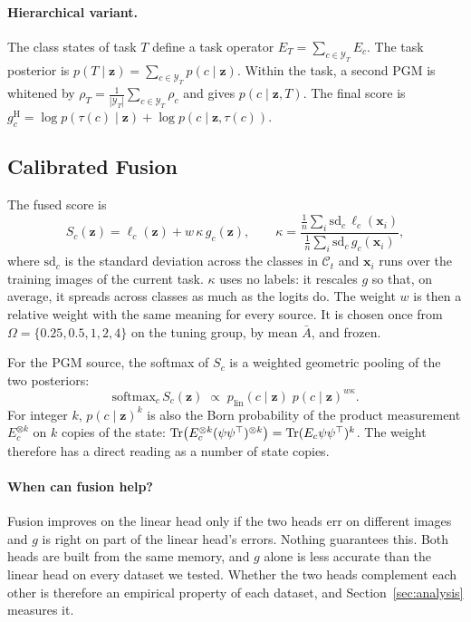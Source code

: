 \paragraph{Hierarchical variant.}
The class states of task $T$ define a task operator
$E_T=\sum_{c\in\mathcal Y_T}E_c$. The task posterior is
$p(T\mid\mathbf z)=\sum_{c\in\mathcal Y_T}p(c\mid\mathbf z)$. Within the task, a
second PGM is whitened by $\rho_T=\frac1{|\mathcal Y_T|}\sum_{c\in\mathcal Y_T}\rho_c$
and gives $p(c\mid\mathbf z,T)$. The final score is
$g^{\mathrm{H}}_c=\log p(\tau(c)\mid\mathbf z)+\log p(c\mid\mathbf z,\tau(c))$.

\subsection{Calibrated Fusion}
The fused score is
\begin{equation}
  S_c(\mathbf z)=\ell_c(\mathbf z)+w\,\kappa\,g_c(\mathbf z),\qquad
  \kappa=\frac{\frac1{n}\sum_{i}\mathrm{sd}_c\,\ell_c(\mathbf x_i)}{\frac1{n}\sum_{i}\mathrm{sd}_c\,g_c(\mathbf x_i)},
  \label{eq:fusion}
\end{equation}
where $\mathrm{sd}_c$ is the standard deviation across the classes in
$\mathcal C_t$ and $\mathbf x_i$ runs over the training images of the current
task. $\kappa$ uses no labels: it rescales $g$ so that, on average, it spreads
across classes as much as the logits do. The weight $w$ is then a relative
weight with the same meaning for every source. It is chosen once from
$\Omega=\{0.25,0.5,1,2,4\}$ on the tuning group, by mean $\bar A$, and frozen.

For the PGM source, the softmax of $S_c$ is a weighted geometric pooling of
the two posteriors:
\begin{equation}
  \mathrm{softmax}_c\,S_c(\mathbf z)\;\propto\;p_{\mathrm{lin}}(c\mid\mathbf z)\;p(c\mid\mathbf z)^{w\kappa}.
\end{equation}
For integer $k$, $p(c\mid\mathbf z)^{k}$ is also the Born probability of the
product measurement $E_c^{\otimes k}$ on $k$ copies of the state:
$\mathrm{Tr}\big(E_c^{\otimes k}(\psi\psi^{\top})^{\otimes k}\big)=\mathrm{Tr}(E_c\psi\psi^{\top})^k$.
The weight therefore has a direct reading as a number of state copies.

\paragraph{When can fusion help?}
Fusion improves on the linear head only if the two heads err on different
images and $g$ is right on part of the linear head's errors. Nothing
guarantees this. Both heads are built from the same memory, and $g$ alone is
less accurate than the linear head on every dataset we tested. Whether the
two heads complement each other is therefore an empirical property of each
dataset, and Section~\ref{sec:analysis} measures it.

